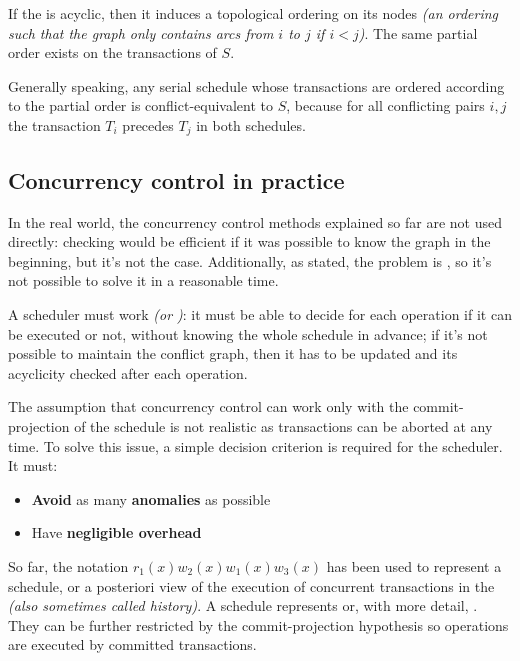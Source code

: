 \documentclass[english]{article}
\begin{document}
If the \CG is acyclic, then it induces a topological ordering on its nodes \textit{(an ordering such that the graph only contains arcs from \(i\) to \(j\) if \(i < j\))}.
The same partial order exists on the transactions of \(S\).

Generally speaking, any serial schedule whose transactions are ordered according to the partial order is conflict-equivalent to \(S\), because for all conflicting pairs \(i, j\) the transaction \(T_i\) precedes \(T_j\) in both schedules.

\subsection{Concurrency control in practice}

In the real world, the concurrency control methods explained so far are not used directly: \CSR checking would be efficient if it was possible to know the graph in the beginning, but it's not the case.
Additionally, as stated, the problem is \NPC, so it's not possible to solve it in a reasonable time.

A scheduler must work  \textit{(or )}: it must be able to decide for each operation if it can be executed or not, without knowing the whole schedule in advance;
if it's not possible to maintain the conflict graph, then it has to be updated and its acyclicity checked after each operation.

The assumption that concurrency control can work only with the commit-projection of the schedule is not realistic as transactions can be aborted at any time.
To solve this issue, a simple decision criterion is required for the scheduler.
It must:

\begin{itemize}
  \item \textbf{Avoid} as many \textbf{anomalies} as possible
  \item Have \textbf{negligible overhead}
\end{itemize}

So far, the notation \(r_1(x) w_2(x) w_1(x) w_3(x)\) has been used to represent a schedule, or a posteriori view of the execution of concurrent transactions in the \dbms \textit{(also sometimes called history)}.
A schedule represents  or, with more detail, .
They can be further restricted by the commit-projection hypothesis so operations are executed by committed transactions.
\end{document}
